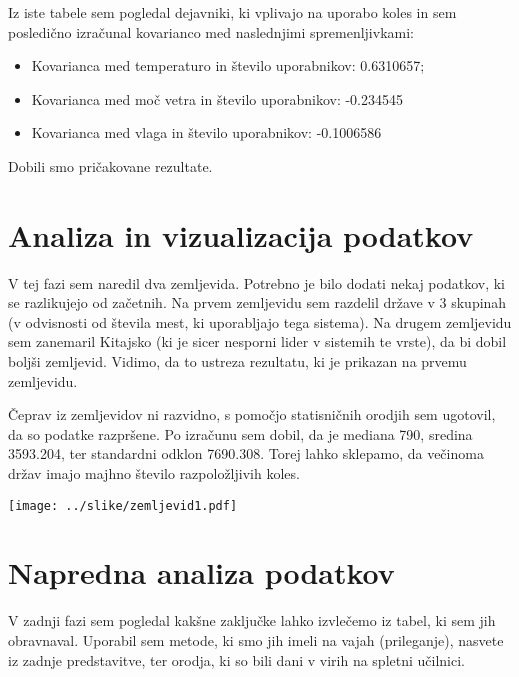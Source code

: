 \documentclass[11pt,a4paper]{article}
\begin{document}
Iz iste tabele sem pogledal dejavniki, ki vplivajo na uporabo koles in sem posledično izračunal kovarianco med naslednjimi spremenljivkami:
\begin{itemize}
\item{Kovarianca med temperaturo in število uporabnikov: 0.6310657;}
\item{Kovarianca med moč vetra in število uporabnikov: -0.234545}
\item{Kovarianca med vlaga in število uporabnikov: -0.1006586}
\end{itemize}
Dobili smo pričakovane rezultate. 






\section{Analiza in vizualizacija podatkov}

V tej fazi sem naredil dva zemljevida. Potrebno je bilo dodati nekaj podatkov, ki se razlikujejo od začetnih. Na prvem zemljevidu sem razdelil države v 3 skupinah (v odvisnosti od števila mest, ki uporabljajo tega sistema). Na drugem zemljevidu sem zanemaril Kitajsko (ki je sicer nesporni lider v sistemih te vrste), da bi dobil boljši zemljevid. Vidimo, da to ustreza rezultatu, ki je prikazan na prvemu zemljevidu.

Čeprav iz zemljevidov ni razvidno, s pomočjo statisničnih orodjih sem ugotovil, da so podatke razpršene. Po izračunu sem dobil, da je mediana 790, sredina 3593.204, ter standardni odklon 7690.308. Torej lahko sklepamo, da večinoma držav imajo majhno število razpoložljivih koles. 


\newpage
\texttt{[image: ../slike/zemljevid1.pdf]}

\section{Napredna analiza podatkov}

  V zadnji fazi sem pogledal kakšne zaključke lahko izvlečemo iz tabel, ki sem jih obravnaval. Uporabil sem metode, ki smo jih imeli na vajah (prileganje), nasvete iz zadnje predstavitve, ter orodja, ki so bili dani v virih na spletni učilnici.
\end{document}

